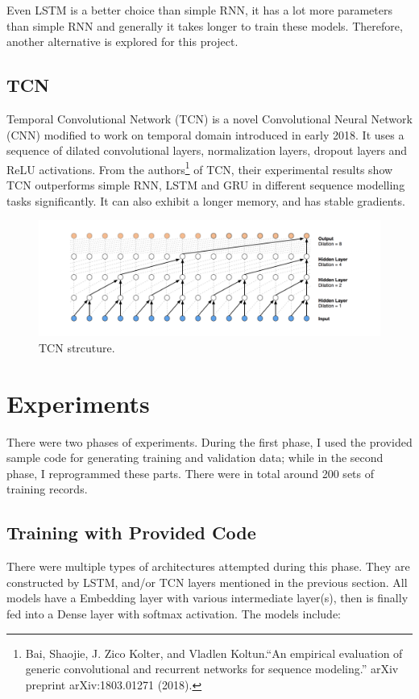 \documentclass[12pt]{article}
\begin{document}
Even LSTM is a better choice than simple RNN, it has a lot more parameters than simple RNN and generally it takes longer to train these models. Therefore, another alternative is explored for this project.
\subsection{TCN}
Temporal Convolutional Network (TCN) is a novel Convolutional Neural Network (CNN) modified to work on temporal domain introduced in early 2018. It uses a sequence of dilated convolutional layers, normalization layers, dropout layers and ReLU activations. From the authors\footnote{Bai, Shaojie, J. Zico Kolter, and Vladlen Koltun.``An empirical evaluation of generic convolutional and recurrent networks for sequence modeling.'' arXiv preprint arXiv:1803.01271 (2018).} of TCN, their experimental results show TCN outperforms simple RNN, LSTM and GRU in different sequence modelling tasks significantly. It can also exhibit a longer memory, and has stable gradients.

\begin{figure}[h!]
	\centering
	\includegraphics[width=\linewidth]{TCN}
	\caption{TCN strcuture.\protect\footnotemark}
	\label{fig:TCN}
\end{figure}

\section{Experiments}
There were two phases of experiments. During the first phase, I used the provided sample code for generating training and validation data; while in the second phase, I reprogrammed these parts. There were in total around 200 sets of training records.

\subsection{Training with Provided Code}
There were multiple types of architectures attempted during this phase. They are constructed by LSTM, and/or TCN layers mentioned in the previous section. All models have a Embedding layer with various intermediate layer(s), then is finally fed into a Dense layer with softmax activation. The models include:
\end{document}
